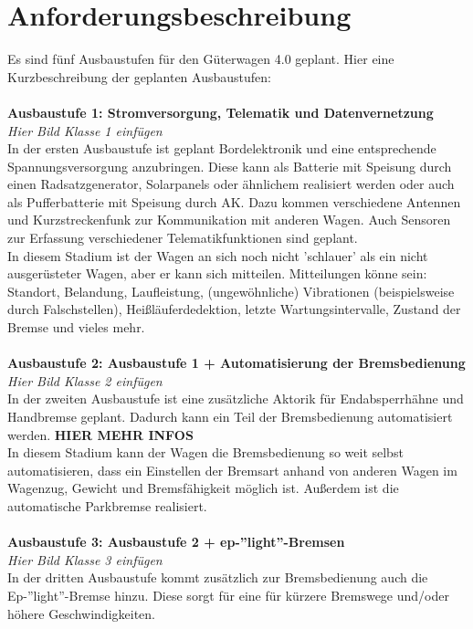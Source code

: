 \section{Anforderungsbeschreibung}
Es sind fünf Ausbaustufen für den Güterwagen 4.0 geplant. Hier eine Kurzbeschreibung der geplanten Ausbaustufen:\\\\
\textbf{Ausbaustufe 1: Stromversorgung, Telematik und Datenvernetzung}\\
\textit{ Hier Bild Klasse 1 einfügen}\\
In der ersten Ausbaustufe ist geplant Bordelektronik und eine entsprechende Spannungsversorgung anzubringen. Diese kann als Batterie mit Speisung durch einen Radsatzgenerator, Solarpanels oder ähnlichem realisiert werden oder auch als Pufferbatterie mit Speisung durch AK. Dazu kommen verschiedene Antennen und Kurzstreckenfunk zur Kommunikation mit anderen Wagen. Auch Sensoren zur Erfassung verschiedener Telematikfunktionen sind geplant. \\
In diesem Stadium ist der Wagen an sich noch nicht 'schlauer' als ein nicht ausgerüsteter Wagen, aber er kann sich mitteilen. Mitteilungen könne sein: Standort, Belandung, Laufleistung, (ungewöhnliche) Vibrationen (beispielsweise durch Falschstellen), Heißläuferdedektion, letzte Wartungsintervalle, Zustand der Bremse und vieles mehr.\\\\
\textbf{Ausbaustufe 2: Ausbaustufe 1 + Automatisierung der Bremsbedienung}\\
\textit{ Hier Bild Klasse 2 einfügen}\\
In der zweiten Ausbaustufe ist eine zusätzliche Aktorik für Endabsperrhähne und Handbremse geplant. Dadurch kann ein Teil der Bremsbedienung automatisiert werden. \textbf{HIER MEHR INFOS}\\
In diesem Stadium kann der Wagen die Bremsbedienung so weit selbst automatisieren, dass ein Einstellen der Bremsart anhand von anderen Wagen im Wagenzug, Gewicht und Bremsfähigkeit möglich ist. Außerdem ist die automatische Parkbremse realisiert.\\\\
\textbf{Ausbaustufe 3: Ausbaustufe 2 + ep-''light''-Bremsen}\\
\textit{Hier Bild Klasse 3 einfügen}\\
In der dritten Ausbaustufe kommt zusätzlich zur Bremsbedienung auch die Ep-''light''-Bremse hinzu. Diese sorgt für eine für kürzere Bremswege und/oder höhere Geschwindigkeiten.\\
